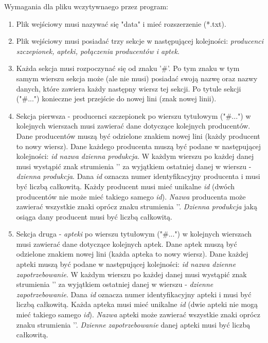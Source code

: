 \documentclass[11pt]{article}
\begin{document}
\vspace{2em}
Wymagania dla pliku wczytywnaego przez program:
\begin{enumerate}
    \item Plik wejściowy musi nazywać się "data" i mieć rozszerzenie (*.txt).
    \item Plik wejściowy musi posiadać trzy sekcje w następującej kolejności: \emph{producenci szczepionek, apteki, połączenia producentów i aptek}.
    \item Każda sekcja musi rozpoczynać się od znaku '\#'. Po tym znaku w tym samym wierszu sekcja może (ale nie musi) posiadać swoją nazwę oraz nazwy danych, które zawiera każdy następny wiersz tej sekcji. Po tytule sekcji ("\#...") konieczne jest przejście do nowej lini (znak nowej linii).
    \item Sekcja pierwsza - producenci szczepionek po wierszu tytułowym ("\#...") w kolejnych wierszach musi zawierać dane dotyczące kolejnych producentów. Dane producentów muszą być odzielone znakiem nowej lini (każdy producent to nowy wiersz). Dane każdego producenta muszą być podane w następującej kolejności: \emph{id \textbar\space nazwa \textbar\space dzienna produkcja}. W każdym wierszu po każdej danej musi wystąpić znak strumienia '\textbar' za wyjątkiem ostatniej danej w wierszu - \emph{dzienna produkcja}. Dana \emph{id} oznacza numer identyfikacyjny producenta i musi być liczbą całkowitą. Każdy producent musi mieć unikalne \emph{id} (dwóch producentów nie może mieć takiego samego \emph{id}). \emph{Nazwa} producenta może zawierać wszystkie znaki oprócz znaku strumienia '\textbar'. \emph{Dzienna produkcja} jaką osiąga dany producent musi być liczbą całkowitą.
    \item Sekcja druga - \emph{apteki} po wierszu tytułowym ("\#...") w kolejnych wierszach musi zawierać dane dotyczące kolejnych aptek. Dane aptek muszą być odzielone znakiem nowej lini (każda apteka to nowy wiersz). Dane każdej apteki muszą być podane w następującej kolejności: \emph{id \textbar\space nazwa \textbar\space dzienne zapotrzebowanie}. W każdym wierszu po każdej danej musi wystąpić znak strumienia '\textbar' za wyjątkiem ostatniej danej w wierszu - \emph{dzienne zapotrzebowanie}. Dana \emph{id} oznacza numer identyfikacyjny apteki i musi być liczbą całkowitą. Każda apteka musi mieć unikalne \emph{id} (dwie apteki nie mogą mieć takiego samego \emph{id}). \emph{Nazwa} apteki może zawierać wszystkie znaki oprócz znaku strumienia '\textbar'. \emph{Dzienne zapotrzebowanie} danej apteki musi być liczbą całkowitą.

\end{enumerate}
\end{document}
